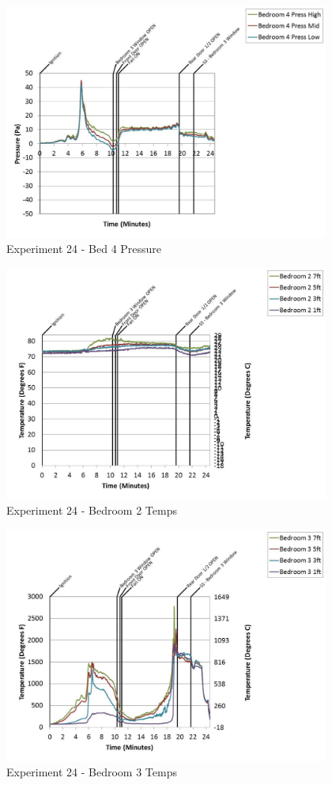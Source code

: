 \documentclass{article}
\begin{document}
\begin{appendices}
	\begin{figure}[h!]
		\centering
		\includegraphics[height=3.05in]{0_Images/Results_Charts/Exp_24_Charts/Bed4Pressure.pdf}
		\caption{Experiment 24 - Bed 4 Pressure}
	\end{figure}
 
	\clearpage

	\begin{figure}[h!]
		\centering
		\includegraphics[height=3.05in]{0_Images/Results_Charts/Exp_24_Charts/Bedroom2Temps.pdf}
		\caption{Experiment 24 - Bedroom 2 Temps}
	\end{figure}
 

	\begin{figure}[h!]
		\centering
		\includegraphics[height=3.05in]{0_Images/Results_Charts/Exp_24_Charts/Bedroom3Temps.pdf}
		\caption{Experiment 24 - Bedroom 3 Temps}
	\end{figure}
 

\end{appendices}
\end{document}
